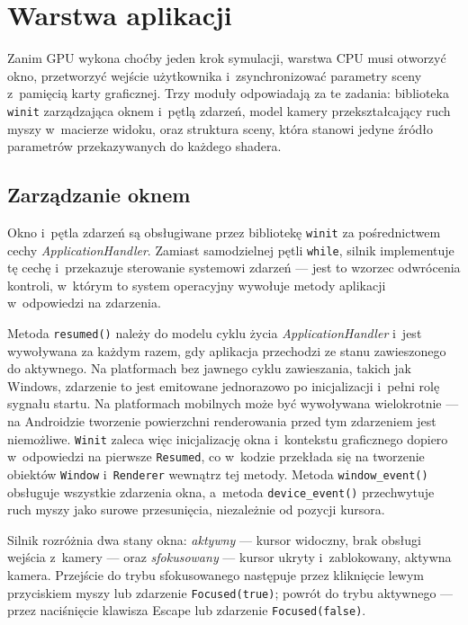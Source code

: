 \section{Warstwa aplikacji}
\label{sec:app_layer}

Zanim GPU wykona choćby jeden krok symulacji, warstwa CPU musi otworzyć
okno, przetworzyć wejście użytkownika i~zsynchronizować parametry sceny
z~pamięcią karty graficznej. Trzy moduły odpowiadają za te zadania:
biblioteka \texttt{winit} zarządzająca oknem i~pętlą zdarzeń, model kamery
przekształcający ruch myszy w~macierze widoku, oraz struktura sceny,
która stanowi jedyne źródło parametrów przekazywanych do każdego shadera.

\subsection{Zarządzanie oknem}
\label{subsec:window}

Okno i~pętla zdarzeń są obsługiwane przez bibliotekę \texttt{winit} za pośrednictwem
cechy \textit{ApplicationHandler}. Zamiast samodzielnej pętli \texttt{while},
silnik implementuje tę cechę i~przekazuje sterowanie systemowi zdarzeń ---
jest to wzorzec odwrócenia kontroli, w~którym to system operacyjny wywołuje
metody aplikacji w~odpowiedzi na zdarzenia.

Metoda \texttt{resumed()} należy do modelu cyklu życia \textit{ApplicationHandler}
i~jest wywoływana za każdym razem, gdy aplikacja przechodzi ze stanu
zawieszonego do aktywnego. Na platformach bez jawnego cyklu zawieszania,
takich jak Windows, zdarzenie to jest emitowane jednorazowo po inicjalizacji
i~pełni rolę sygnału startu. Na platformach mobilnych może być wywoływana
wielokrotnie --- na Androidzie tworzenie powierzchni renderowania
przed tym zdarzeniem jest niemożliwe. \texttt{Winit} zaleca\cite{winit} więc inicjalizację okna
i~kontekstu graficznego dopiero w~odpowiedzi na pierwsze \texttt{Resumed},
co w~kodzie przekłada się na tworzenie obiektów \texttt{Window}
i~\texttt{Renderer} wewnątrz tej metody. Metoda \texttt{window\_event()} obsługuje wszystkie
zdarzenia okna, a~metoda \texttt{device\_event()} przechwytuje ruch myszy
jako surowe przesunięcia, niezależnie od pozycji kursora.

Silnik rozróżnia dwa stany okna: \textit{aktywny} --- kursor widoczny,
brak obsługi wejścia z~kamery --- oraz \textit{sfokusowany} --- kursor
ukryty i~zablokowany, aktywna kamera. Przejście do trybu sfokusowanego
następuje przez kliknięcie lewym przyciskiem myszy lub zdarzenie
\texttt{Focused(true)}; powrót do trybu aktywnego --- przez naciśnięcie
klawisza Escape lub zdarzenie \texttt{Focused(false)}.

